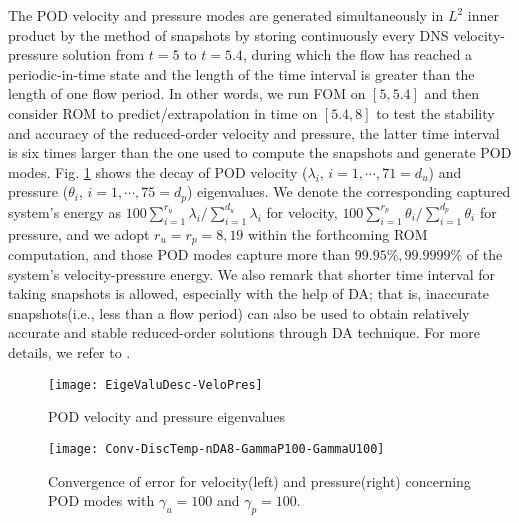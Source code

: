 \documentclass[10pt,twoside,openany,UTF8,CJK]{article}
\begin{document}
	\indent The POD velocity and pressure modes are generated simultaneously in $L^2$ inner product by the method of snapshots by storing continuously every DNS velocity-pressure solution from $t=5$ to $t=5.4$, during which the flow has reached a periodic-in-time state and the length of the time interval is greater than the length of one flow period. In other words, we run FOM on $[5,5.4]$ and then consider ROM to predict/extrapolation in time on $[5.4,8]$ to test the stability and accuracy of the reduced-order velocity and pressure, the latter time interval is six times larger than the one used to compute the snapshots and generate POD modes. Fig. \ref{EigeValuDesc-VeloPres} shows the decay of POD velocity ($\lambda_{i}$, $i=1,\cdots,71=d_u$) and pressure ($\theta_i$, $i=1,\cdots,75=d_p$) eigenvalues. We denote the corresponding captured system's energy as $100\sum_{i=1}^{r_u}\lambda_{i}/\sum_{i=1}^{d_u}\lambda_{i}$ for velocity, $100\sum_{i=1}^{r_p}\theta_{i}/\sum_{i=1}^{d_p}\theta_{i}$ for pressure, and we adopt $r_u=r_p=8,19$ within the forthcoming ROM computation, and those POD modes capture more than $99.95\%,99.9999\%$ of the system's velocity-pressure energy. We also remark that shorter time interval for taking snapshots is allowed, especially with the help of DA; that is, inaccurate snapshots(i.e., less than a flow period) can also be used to obtain relatively accurate and stable reduced-order solutions through DA technique. For more details, we refer to \cite{CDA-2019-CMAME,CDA-POD-2022-JCAM}.
	\begin{figure}
		\centering
		\texttt{[image: EigeValuDesc-VeloPres]}
		\caption{POD velocity and pressure eigenvalues}\label{EigeValuDesc-VeloPres}
	\end{figure}
    \begin{figure}
    	\centering
    	\texttt{[image: Conv-DiscTemp-nDA8-GammaP100-GammaU100]}
    	\caption{Convergence of error for velocity(left) and pressure(right) concerning POD modes with $\gamma_u=100$ and $\gamma_p=100$.}\label{Conv-DiscTemp}
    \end{figure}
\end{document}
